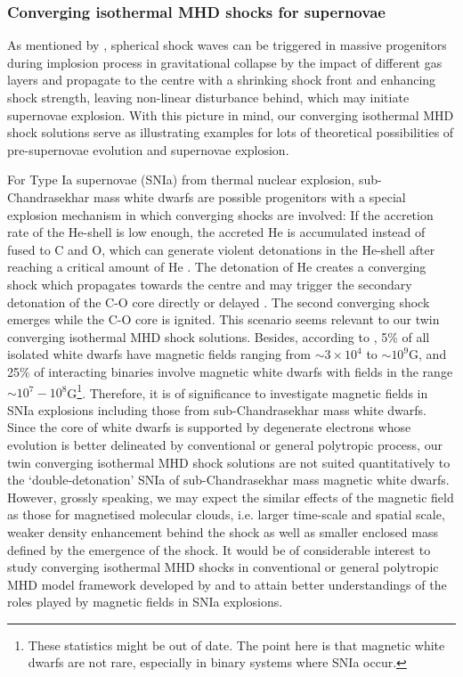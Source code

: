 \documentclass[fleqn,usenatbib]{mnras}
\begin{document}
\subsubsection{Converging isothermal MHD shocks for supernovae}
As mentioned by \citet{lou2014self}, spherical shock waves can be triggered in massive progenitors during implosion process in gravitational collapse by the impact of different gas layers and propagate to the centre with a shrinking shock front and enhancing shock strength, leaving non-linear disturbance behind, which may initiate supernovae explosion. With this picture in mind, our converging isothermal MHD shock solutions serve as illustrating examples for lots of theoretical possibilities of pre-supernovae evolution and supernovae explosion. 

For Type Ia supernovae (SNIa) from thermal nuclear explosion, sub-Chandrasekhar mass white dwarfs are possible progenitors with a special explosion mechanism in which converging shocks are involved: If the accretion rate of the He-shell is low enough, the accreted He is accumulated instead of fused to C and O, which can generate violent detonations in the He-shell after reaching a critical amount of He \citep{fink2007double}. The detonation of He creates a converging shock which propagates towards the centre and may trigger the secondary detonation of the C-O core directly or delayed \citep{fink2010double}. The second converging shock emerges while the C-O core is ignited.
This scenario seems relevant to our twin converging isothermal MHD shock solutions. Besides, according to \citet{wickramasinghe2000magnetism}, 5\%
of all isolated white dwarfs have magnetic fields ranging from $\sim 3\times 10^{4}$ to $\sim 10^{9}$G, and 25\% of interacting binaries involve magnetic white dwarfs with fields in the range $\sim 10^{7}-10^{8}$G\footnote{These statistics might be out of date. The point here is that magnetic white dwarfs are not rare, especially in binary systems where SNIa occur.}. Therefore, it is of significance to investigate magnetic fields in SNIa explosions including those from sub-Chandrasekhar mass white dwarfs. Since the core of white dwarfs is supported by degenerate electrons whose evolution is better delineated by conventional or general polytropic process, our twin converging isothermal MHD shock solutions are not suited quantitatively to the `double-detonation' SNIa of sub-Chandrasekhar mass magnetic white dwarfs.  However, grossly speaking, we may expect the similar effects of the magnetic field as those for magnetised molecular clouds, i.e. larger time-scale and spatial scale, weaker density enhancement behind the shock as well as smaller enclosed mass defined by the emergence of the shock. It would be of considerable interest to study converging isothermal MHD shocks in conventional or general polytropic MHD model framework developed by \citet{wang2008dynamic} and \citep{lou2010general} to attain better understandings of the roles played by magnetic fields in SNIa explosions.
\end{document}
